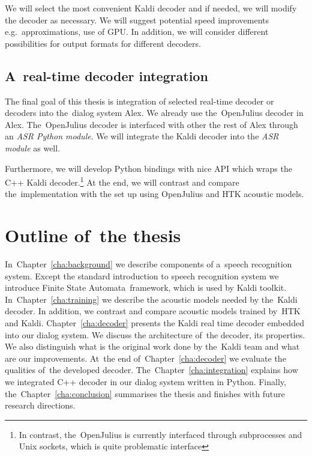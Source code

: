 We will select the most convenient Kaldi decoder and if needed, we will modify the decoder as necessary. 
We will suggest potential speed improvements e.g.\ approximations, use of \ac{GPU}.
In addition, we will consider different possibilities for output formats for different decoders.

\subsection{A~real-time decoder integration} 
\label{sub:integration}
The final goal of this thesis is integration of selected real-time decoder or decoders into the~dialog system Alex.
We already use the~OpenJulius decoder in Alex. The~OpenJulius decoder is interfaced with other the rest of Alex
through an {\it ASR Python module}. We will integrate the Kaldi decoder into the {\it ASR module}\/ as well.

Furthermore, we will develop Python bindings with nice \ac{API} which wraps the C++ Kaldi decoder.\footnote{In contrast, 
the~OpenJulius is currently interfaced through subprocesses and Unix sockets, which is quite problematic interface} 
At the end, we will contrast and compare the~implementation with the set up using OpenJulius and \ac{HTK} 
acoustic models.



\section{Outline of~the thesis} 
\label{sec:outline_of_the_thesis}
In~Chapter~\ref{cha:background} we describe components of a~speech recognition system.  
Except the standard introduction to speech recognition system we introduce Finite State Automata~framework,
which is used by Kaldi toolkit. In~Chapter~\ref{cha:training} we describe the acoustic 
models needed by the~Kaldi decoder. 
In addition, we contrast and compare acoustic models trained by~\ac{HTK} and Kaldi. 
Chapter~\ref{cha:decoder} presents the Kaldi real time decoder embedded into our dialog system.
We discuss the architecture of~the decoder, its properties. We also distinguish what is the original work done by 
the~Kaldi team and what are our improvements. At~the end of~Chapter~\ref{cha:decoder} 
we evaluate the qualities of~the developed decoder.
The~Chapter~\ref{cha:integration} explains how we integrated C++ decoder in our dialog system written in Python.
Finally, the~Chapter~\ref{cha:conclusion} summarises the thesis and finishes with future research directions.

